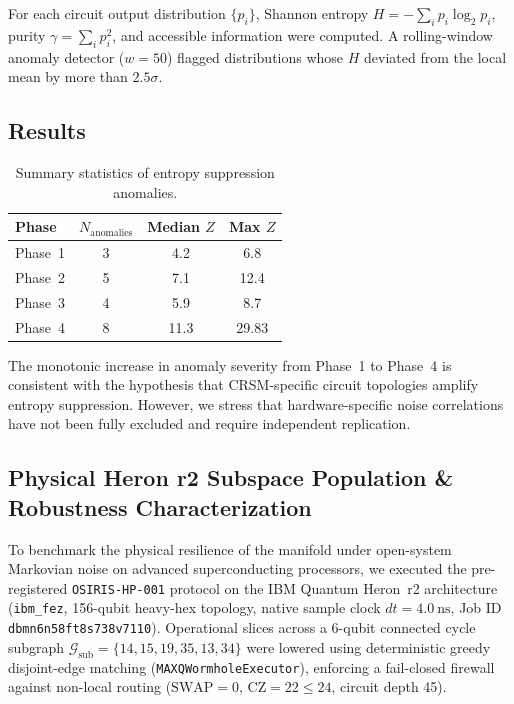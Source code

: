 \documentclass[aps,preprint,superscriptaddress,longbibliography]{revtex4-2}
\begin{document}
For each circuit output distribution $\{p_i\}$, Shannon entropy
$H = -\sum_i p_i \log_2 p_i$, purity
$\gamma = \sum_i p_i^2$, and accessible information were computed.
A rolling-window anomaly detector ($w = 50$) flagged distributions
whose $H$ deviated from the local mean by more than $2.5\sigma$.

\subsection{Results}

\begin{table}[H]
\centering
\caption{Summary statistics of entropy suppression anomalies.}
\label{tab:entropy}
\begin{tabular}{lccc}
\toprule
Phase & $N_{\mathrm{anomalies}}$ & Median $Z$ &
Max $Z$ \\
\midrule
Phase~1 & 3 & 4.2 & 6.8 \\
Phase~2 & 5 & 7.1 & 12.4 \\
Phase~3 & 4 & 5.9 & 8.7 \\
Phase~4 & 8 & 11.3 & 29.83 \\
\bottomrule
\end{tabular}
\end{table}

The monotonic increase in anomaly severity from Phase~1 to Phase~4
is consistent with the hypothesis that CRSM-specific circuit
topologies amplify entropy suppression.  However, we stress that
hardware-specific noise correlations have not been fully excluded
and require independent replication.

\subsection{Physical Heron r2 Subspace Population \& Robustness Characterization}
\label{sec:heron_telemetry}

To benchmark the physical resilience of the manifold under open-system Markovian noise on advanced superconducting processors, we executed the pre-registered \texttt{OSIRIS-HP-001} protocol on the IBM Quantum Heron~r2 architecture (\texttt{ibm\_fez}, 156-qubit heavy-hex topology, native sample clock $dt = \SI{4.0}{\nano\second}$, Job ID \texttt{dbmn6n58ft8s738v7110}). Operational slices across a 6-qubit connected cycle subgraph $\mathcal{G}_{\mathrm{sub}} = \{14, 15, 19, 35, 13, 34\}$ were lowered using deterministic greedy disjoint-edge matching (\texttt{MAXQWormholeExecutor}), enforcing a fail-closed firewall against non-local routing ($\text{SWAP} = 0$, $\text{CZ} = 22 \le 24$, circuit depth 45).
\end{document}
